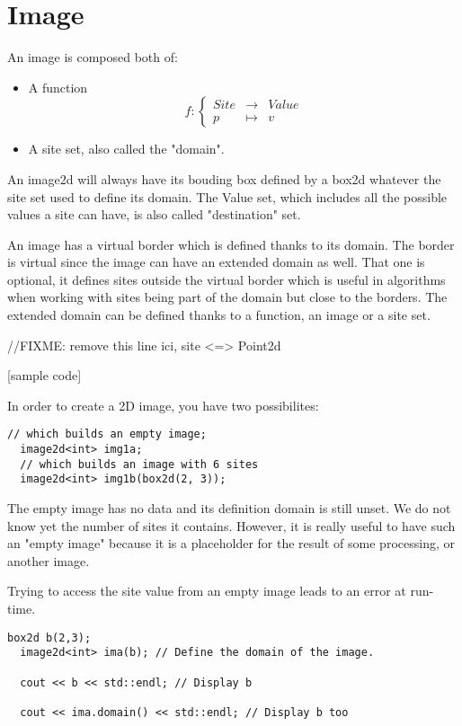 \documentclass{report}
\begin{document}
\clearpage
\newpage
\section{Image}

An image is composed both of:
\begin{itemize}
\item A function $$
f : \left\{
  \begin{array}{lll}
    Site &\rightarrow & Value \\
    p & \mapsto & v
  \end{array}
\right.
$$
\item A site set, also called the "domain".
\end{itemize}

An image2d will always have its bouding box defined by a box2d whatever the
site set used to define its domain.
The Value set, which includes all the possible values a site can have, is also
called "destination" set.

An image has a virtual border which is defined thanks to its domain. The
 border is virtual since the image can have an extended domain as well.
That one is optional, it defines sites outside the virtual border which is
useful in algorithms when working with sites being part of the domain but close
to the borders. The extended domain can be defined thanks to a function, an
image or a site set.

//FIXME: remove this line
ici, site <=> Point2d


[sample code]

In order to create a 2D image, you have two possibilites:
\begin{lstlisting}[frame=single]
  // which builds an empty image;
  image2d<int> img1a;
  // which builds an image with 6 sites
  image2d<int> img1b(box2d(2, 3));
\end{lstlisting}

The empty image has no data and its definition domain is still unset.  We do
not know yet the number of sites it contains. However, it is really useful to
have such an "empty image" because it is a placeholder for the result of some
processing, or another image.

Trying to access the site value from an empty image leads to an error at
run-time.


\begin{lstlisting}[frame=single]
  box2d b(2,3);
  image2d<int> ima(b); // Define the domain of the image.

  cout << b << std::endl; // Display b

  cout << ima.domain() << std::endl; // Display b too
\end{lstlisting}
\end{document}
